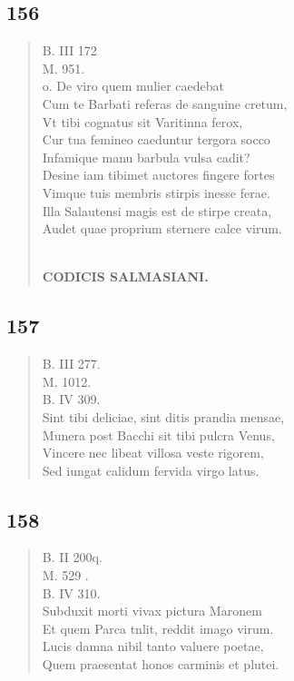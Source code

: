 \documentclass[11pt, a4paper]{report}
\begin{document}
            \subsection*{156}
      \begin{verse}
      B. III 172 \\ M. 951. \\ o. De viro quem mulier caedebat \\ Cum te Barbati referas de sanguine cretum, \\ Vt tibi cognatus sit Varitinna ferox, \\ Cur tua femineo caeduntur tergora socco \\ Infamique manu barbula vulsa cadit? \\ Desine iam tibimet auctores fingere fortes \\ Vimque tuis membris stirpis inesse ferae. \\ Illa Salautensi magis est de stirpe creata, \\ Audet quae proprium sternere calce virum. \\ 
        ﻿\pagebreak 
    \begin{center} \textbf{CODICIS SALMASIANI.} \end{center} \marginpar{[147]} 
      \end{verse}
  
            \subsection*{157}
      \begin{verse}
      B. III 277. \\ M. 1012. \\ B. IV 309. \\ Sint tibi deliciae, sint ditis prandia mensae, \\ Munera post Bacchi sit tibi pulcra Venus, \\ Vincere nec libeat villosa veste rigorem, \\ Sed iungat calidum fervida virgo latus. \\ 
      \end{verse}
  
            \subsection*{158}
      \begin{verse}
      B. II 200q. \\ M. 529 . \\ B. IV 310. \\ Subduxit morti vivax pictura Maronem \\ Et quem Parca tnlit, reddit imago virum. \\ Lucis damna nibil tanto valuere poetae, \\ Quem praesentat honos carminis et plutei. \\ 
      \end{verse}
  
\end{document}

